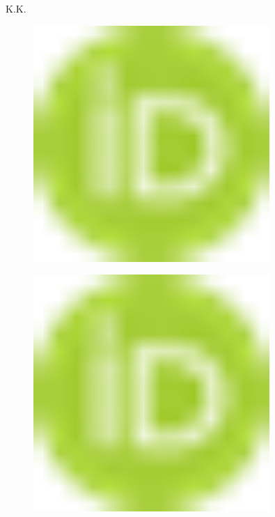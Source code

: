 {K.K.
\begin{figure}[H]
	\centering
	\includegraphics[width=0.8\textwidth]{media/ekon3/image1}
	\caption*{}
\end{figure}

\begin{figure}[H]
	\centering
	\includegraphics[width=0.8\textwidth]{media/ekon3/image1}
	\caption*{}
\end{figure}


}
